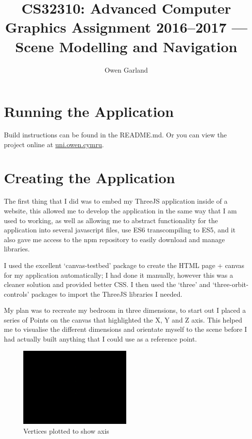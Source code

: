 \documentclass[runningheads,a4paper]{llncs}
\begin{document}
\title{CS32310: Advanced Computer Graphics Assignment 2016--2017 — Scene Modelling and Navigation}

\author{Owen Garland}



\maketitle
\newpage

\section{Running the Application}
Build instructions can be found in the README.md. Or you can view the project online at \href{http://uni.owen.cymru}{uni.owen.cymru}.

\section{Creating the Application}
  The first thing that I did was to embed my ThreeJS application inside of a website, this allowed me to develop the application in the same way that I am used to working, as well as allowing me to abstract functionality for the application into several javascript files, use ES6 transcompiling to ES5, and it also gave me access to the npm repository to easily download and manage libraries. 

  I used the excellent `canvas-testbed' package to create the HTML page + canvas for my application automatically; I had done it manually, however this was a cleaner solution and provided better CSS\@. I then used the `three' and `three-orbit-controls' packages to import the ThreeJS libraries I needed. 

  My plan was to recreate my bedroom in three dimensions, to start out I placed a series of Points on the canvas that highlighted the X, Y and Z axis. This helped me to visualise the different dimensions and orientate myself to the scene before I had actually built anything that I could use as a reference point. 
  
  \begin{figure}[H]
    \centering
    \includegraphics[width=0.5\textwidth]{images/1.png}
    \caption{Vertices plotted to show axis}
    \label{fig:window}
  \end{figure}
\end{document}
